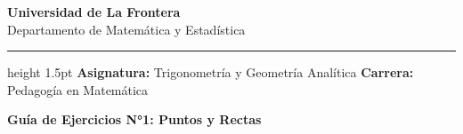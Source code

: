 \documentclass[12pt,a4paper]{article}
\begin{document}
\begin{center}
    {\bf\Large Universidad de La Frontera}\\[2pt]
    {\small Departamento de Matemática y Estadística}\\[4pt]
    \hrule height 1.5pt
    \vspace{0.3cm}
    {\small\textbf{Asignatura:} Trigonometría y Geometría Analítica \hfill \textbf{Carrera:} Pedagogía en Matemática}
\end{center}

\vspace{0.2cm}
\begin{center}
    {\Large\bfseries Guía de Ejercicios N°1: Puntos y Rectas}
\end{center}
\vspace{0.3cm}

\sffamily\small
\end{document}
